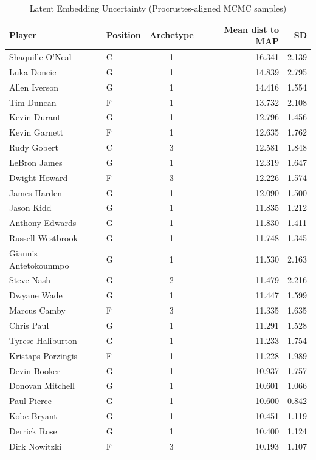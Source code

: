 \begin{table}[t]
\caption*{
{\fontsize{20}{25}\selectfont  Latent Embedding Uncertainty (Procrustes-aligned MCMC samples)\fontsize{12}{15}\selectfont }
} 
\fontsize{12.0pt}{14.0pt}\selectfont
\begin{tabular*}{\linewidth}{@{\extracolsep{\fill}}llcrr}
\toprule
Player & Position & Archetype & Mean dist to MAP & SD \\ 
\midrule\addlinespace[2.5pt]
Shaquille O'Neal & C & 1 & 16.341 & 2.139 \\ 
Luka Doncic & G & 1 & 14.839 & 2.795 \\ 
Allen Iverson & G & 1 & 14.416 & 1.554 \\ 
Tim Duncan & F & 1 & 13.732 & 2.108 \\ 
Kevin Durant & G & 1 & 12.796 & 1.456 \\ 
Kevin Garnett & F & 1 & 12.635 & 1.762 \\ 
Rudy Gobert & C & 3 & 12.581 & 1.848 \\ 
LeBron James & G & 1 & 12.319 & 1.647 \\ 
Dwight Howard & F & 3 & 12.226 & 1.574 \\ 
James Harden & G & 1 & 12.090 & 1.500 \\ 
Jason Kidd & G & 1 & 11.835 & 1.212 \\ 
Anthony Edwards & G & 1 & 11.830 & 1.411 \\ 
Russell Westbrook & G & 1 & 11.748 & 1.345 \\ 
Giannis Antetokounmpo & G & 1 & 11.530 & 2.163 \\ 
Steve Nash & G & 2 & 11.479 & 2.216 \\ 
Dwyane Wade & G & 1 & 11.447 & 1.599 \\ 
Marcus Camby & F & 3 & 11.335 & 1.635 \\ 
Chris Paul & G & 1 & 11.291 & 1.528 \\ 
Tyrese Haliburton & G & 1 & 11.233 & 1.754 \\ 
Kristaps Porzingis & F & 1 & 11.228 & 1.989 \\ 
Devin Booker & G & 1 & 10.937 & 1.757 \\ 
Donovan Mitchell & G & 1 & 10.601 & 1.066 \\ 
Paul Pierce & G & 1 & 10.600 & 0.842 \\ 
Kobe Bryant & G & 1 & 10.451 & 1.119 \\ 
Derrick Rose & G & 1 & 10.400 & 1.124 \\ 
Dirk Nowitzki & F & 3 & 10.193 & 1.107 \\ 

\end{tabular*}
\end{table}
